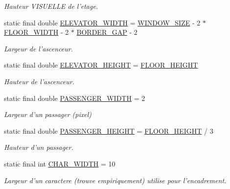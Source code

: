 \begin{DoxyCompactItemize}
\begin{DoxyCompactList}\small\item\em Hauteur V\-I\-S\-U\-E\-L\-L\-E de l'etage. \end{DoxyCompactList}\item 
static final double \hyperlink{classDefines_a6db91ad53210c6221ec3539abdd86888}{E\-L\-E\-V\-A\-T\-O\-R\-\_\-\-W\-I\-D\-T\-H} = \hyperlink{classDefines_aafb660e1c1534aec4d2cee6cfe57029f}{W\-I\-N\-D\-O\-W\-\_\-\-S\-I\-Z\-E} -\/ 2 $\ast$ \hyperlink{classDefines_ad5528ce6b91911a4ca4e9f364543ef9c}{F\-L\-O\-O\-R\-\_\-\-W\-I\-D\-T\-H} -\/ 2 $\ast$ \hyperlink{classDefines_ae1cb2849525afcbee188dd5681a29f2f}{B\-O\-R\-D\-E\-R\-\_\-\-G\-A\-P} -\/ 2
\begin{DoxyCompactList}\small\item\em Largeur de l'ascenceur. \end{DoxyCompactList}\item 
static final double \hyperlink{classDefines_abe0b8ba696fb8c7c3834901f0d1d654e}{E\-L\-E\-V\-A\-T\-O\-R\-\_\-\-H\-E\-I\-G\-H\-T} = \hyperlink{classDefines_a2a43fe315bf385b8693c70fbf824a3d0}{F\-L\-O\-O\-R\-\_\-\-H\-E\-I\-G\-H\-T}
\begin{DoxyCompactList}\small\item\em Hauteur de l'ascenceur. \end{DoxyCompactList}\item 
static final double \hyperlink{classDefines_a0cfe94bdf035c76ba9900a7022cef92b}{P\-A\-S\-S\-E\-N\-G\-E\-R\-\_\-\-W\-I\-D\-T\-H} = 2
\begin{DoxyCompactList}\small\item\em Largeur d'un passager (pixel) \end{DoxyCompactList}\item 
static final double \hyperlink{classDefines_a651291f3b8a00e1e92a7275cf3d2430e}{P\-A\-S\-S\-E\-N\-G\-E\-R\-\_\-\-H\-E\-I\-G\-H\-T} = \hyperlink{classDefines_a2a43fe315bf385b8693c70fbf824a3d0}{F\-L\-O\-O\-R\-\_\-\-H\-E\-I\-G\-H\-T} / 3
\begin{DoxyCompactList}\small\item\em Hauteur d'un passager. \end{DoxyCompactList}\item 
static final int \hyperlink{classDefines_a35af074df13dcc76204831f1910d2353}{C\-H\-A\-R\-\_\-\-W\-I\-D\-T\-H} = 10
\begin{DoxyCompactList}\small\item\em Largeur d'un caractere (trouve empiriquement) utilise pour l'encadrement. \end{DoxyCompactList}\item 

\end{DoxyCompactItemize}
